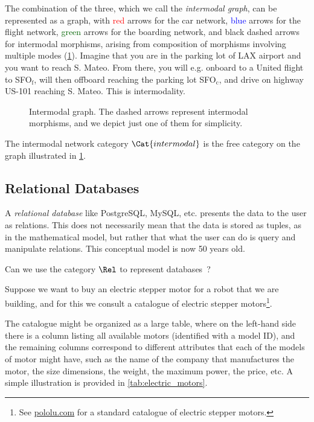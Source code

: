 \begin{example}
The combination of the three, which we call the \emph{intermodal graph}, can be represented as a graph, with \textcolor{red}{red} arrows for the car network, \textcolor{blue}{blue} arrows for the flight network, \textcolor{darkgreen}{green} arrows for the boarding network, and black dashed arrows for intermodal morphisms, arising from composition of morphisms involving multiple modes (\cref{fig:intermodal}). Imagine that you are in the parking lot of \textsf{LAX} airport and you want to reach \textsf{S. Mateo}. From there, you will e.g. onboard to a \textsf{United} flight to \textsf{SFO}$_\mathrm{f}$, will then offboard reaching the parking lot \textsf{SFO}$_\mathrm{c}$, and drive on highway \textsf{US-101} reaching \textsf{S. Mateo}. This is intermodality.

\begin{figure}[h!]
\begin{center}
\end{center}
\caption{Intermodal graph. The dashed arrows represent intermodal morphisms, and we depict just one of them for simplicity. \label{fig:intermodal}
}
\end{figure}
\end{example}

The intermodal network category $\Cat{intermodal}$ is the free category on the graph illustrated in \cref{fig:intermodal}.



\subsection{Relational Databases}
\label{def:relational-databases}

A \emph{relational database} like PostgreSQL, MySQL, etc. presents
the data to the user as relations. This does not necessarily mean
that the data is stored as tuples, as in the mathematical model, but
rather that what the user can do is query and manipulate relations.
This conceptual model is now 50 years old.

Can we use the category $\Rel$ to represent databases~\cite{codd2002relational}?

Suppose we want to buy an electric stepper motor for a robot that we are building, and for this we consult a catalogue of electric stepper motors\footnote{See \href{https://www.pololu.com/category/87/stepper-motors}{pololu.com} for a standard catalogue of electric stepper motors.}.

The catalogue might be organized as a large table, where on the left-hand side there is a column listing all available motors (identified with a model ID), and the remaining columns correspond to different attributes that each of the models of motor might have, such as the name of the company that manufactures the motor, the size dimensions, the weight, the maximum power, the price, etc. A simple illustration is provided in \cref{tab:electric_motors}.

